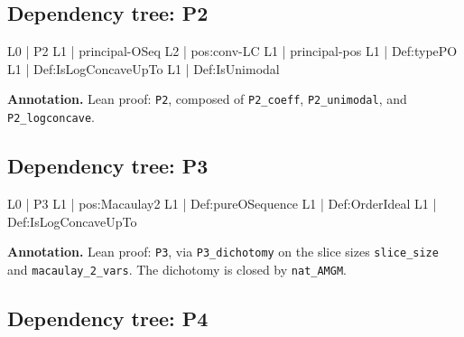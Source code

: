 \documentclass[11pt,reqno]{amsart}
\begin{document}
\medskip

\subsection*{Dependency tree: \textsf{P2}}

\noindent%
\begin{minipage}[t]{0.48\linewidth}
	\vspace{0pt}
	\begin{verbatimbox}
		L0 | P2
		L1 |   principal-OSeq
		L2 |     pos:conv-LC
		L1 |   principal-pos
		L1 |   Def:typePO
		L1 |   Def:IsLogConcaveUpTo
		L1 |   Def:IsUnimodal
	\end{verbatimbox}
\end{minipage}\hfill 
\begin{minipage}[t]{0.48\linewidth}
	\vspace{0pt}
	\textbf{Annotation.} Lean proof: \texttt{P2}, composed of \texttt{P2\_coeff}, \texttt{P2\_unimodal}, and \texttt{P2\_logconcave}.
\end{minipage}

\medskip

\subsection*{Dependency tree: \textsf{P3}}

\noindent%
\begin{minipage}[t]{0.48\linewidth}
	\vspace{0pt}
	\begin{verbatimbox}
		L0 | P3
		L1 |   pos:Macaulay2
		L1 |   Def:pureOSequence
		L1 |   Def:OrderIdeal
		L1 |   Def:IsLogConcaveUpTo
	\end{verbatimbox}
\end{minipage}\hfill 
\begin{minipage}[t]{0.48\linewidth}
	\vspace{0pt}
	\textbf{Annotation.} Lean proof: \texttt{P3}, via \texttt{P3\_dichotomy} on the slice sizes \texttt{slice\_size} and \texttt{macaulay\_2\_vars}. The dichotomy is closed by \texttt{nat\_AMGM}.
\end{minipage}

\medskip

\subsection*{Dependency tree: \textsf{P4}}
\end{document}
